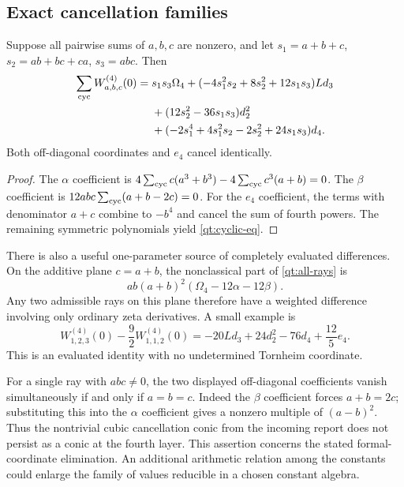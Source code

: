 \subsection{Exact cancellation families}

\begin{corollary}\label{qt:cyclic}
Suppose all pairwise sums of $a,b,c$ are nonzero, and let
$s_1=a+b+c$, $s_2=ab+bc+ca$, $s_3=abc$. Then
\begin{align}\label{qt:cyclic-eq}
 \sum_{\mathrm{cyc}} W_{a,b,c}^{(4)}(0)={}&s_1s_3\Omega_4
 +(-4s_1^2s_2+8s_2^2+12s_1s_3)Ld_3\notag\\
 &+(12s_2^2-36s_1s_3)d_2^2\notag\\
 &+(-2s_1^4+4s_1^2s_2-2s_2^2+24s_1s_3)d_4.
\end{align}
Both off-diagonal coordinates and $e_4$ cancel identically.
\end{corollary}
\begin{proof}
The $\alpha$ coefficient is
$4\sum_{\rm cyc}c(a^3+b^3)-4\sum_{\rm cyc}c^3(a+b)=0$.
The $\beta$ coefficient is $12abc\sum_{\rm cyc}(a+b-2c)=0$.
For the $e_4$ coefficient, the terms with denominator $a+c$
combine to $-b^4$ and cancel the sum of fourth powers. The remaining
symmetric polynomials yield \eqref{qt:cyclic-eq}.
\end{proof}

There is also a useful one-parameter source of completely evaluated
differences. On the additive plane $c=a+b$, the nonclassical part of
\eqref{qt:all-rays} is
\[
 ab(a+b)^2(\Omega_4-12\alpha-12\beta).
\]
Any two admissible rays on this plane therefore have a weighted
difference involving only ordinary zeta derivatives. A small example is
\begin{equation}\label{qt:short-difference}
 \boxed{W_{1,2,3}^{(4)}(0)-\frac92 W_{1,1,2}^{(4)}(0)
 =-20Ld_3+24d_2^2-76d_4+\frac{12}{5}e_4.}
\end{equation}
This is an evaluated identity with no undetermined Tornheim coordinate.

For a single ray with $abc\ne0$, the two displayed off-diagonal
coefficients vanish simultaneously if and only if $a=b=c$.
Indeed the $\beta$ coefficient forces $a+b=2c$; substituting this
into the $\alpha$ coefficient gives a nonzero multiple of
$(a-b)^2$. Thus the nontrivial cubic cancellation conic from the
incoming report does not persist as a conic at the fourth layer.
This assertion concerns the stated formal-coordinate elimination.
An additional arithmetic relation among the constants could enlarge
the family of values reducible in a chosen constant algebra.

